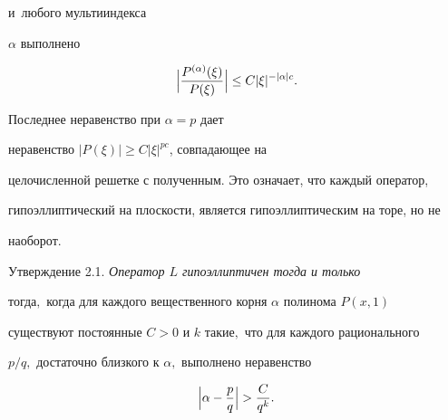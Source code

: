 и~любого мультииндекса

$\alpha$ выполнено 

$$

\Bigl | \frac {P^{(\alpha)} (\xi)}{P(\xi)} \Bigr | \le

C |\xi |^{- |\alpha| c}.$$ 

\rm 



Последнее неравенство при $\alpha = p$ дает

неравенство $|P(\xi)| \ge C |\xi |^{p c}$, совпадающее на

целочисленной решетке с полученным. Это означает, что каждый оператор,

гипоэллиптический на плоскости, является гипоэллиптическим на торе, но не

наоборот.





\smallskip



\hypertarget{bur:utv2.1}{}



{\small\sc Утверждение  2.1.} \it Оператор $L$ гипоэллиптичен тогда  и только

тогда$,$ когда для каждого вещественного корня $\alpha$ полинома $P (x, 1)$

существуют постоянные $C > 0$ и $k$ такие$,$ что для каждого рационального

$p/q,$ достаточно близкого к $\alpha,$ выполнено неравенство

$$

\Bigl | \alpha - \frac pq \Bigr | > \frac C{q^k}.

$$ \rm

\smallskip




